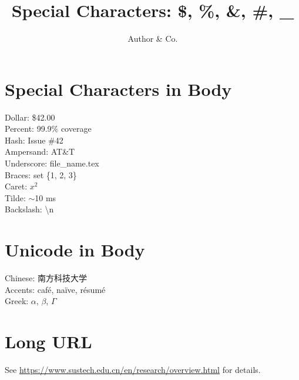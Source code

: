 \documentclass{SUSTechHomework}
\title{Special Characters: \$, \%, \&, \#, \_{}}
\author{Author \& Co.}
\begin{document}
\maketitle

\section{Special Characters in Body}

Dollar: \$42.00 \\
Percent: 99.9\% coverage \\
Hash: Issue \#42 \\
Ampersand: AT\&T \\
Underscore: file\_name.tex \\
Braces: set \{1, 2, 3\} \\
Caret: $x^{2}$ \\
Tilde: $\sim$10 ms \\
Backslash: \textbackslash{}n \\

\section{Unicode in Body}

Chinese: 南方科技大学 \\
Accents: café, naïve, résumé \\
Greek: $\alpha$, $\beta$, $\Gamma$ \\

\section{Long URL}

See \url{https://www.sustech.edu.cn/en/research/overview.html} for details.
\end{document}
